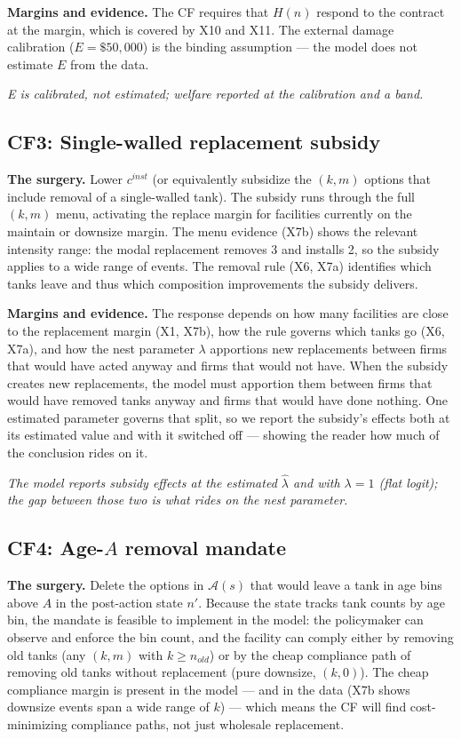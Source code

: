 \documentclass[
  letterpaper,
  DIV=11,
  numbers=noendperiod]{scrartcl}
\begin{document}
\textbf{Margins and evidence.} The CF requires that \(H(n)\) respond to
the contract at the margin, which is covered by X10 and X11. The
external damage calibration (\(E = \$50{,}000\)) is the binding
assumption --- the model does not estimate \(E\) from the data.

\emph{E is calibrated, not estimated; welfare reported at the
calibration and a band.}

\subsection{CF3: Single-walled replacement
subsidy}\label{cf3-single-walled-replacement-subsidy}

\textbf{The surgery.} Lower \(c^{inst}\) (or equivalently subsidize the
\((k,m)\) options that include removal of a single-walled tank). The
subsidy runs through the full \((k,m)\) menu, activating the replace
margin for facilities currently on the maintain or downsize margin. The
menu evidence (X7b) shows the relevant intensity range: the modal
replacement removes 3 and installs 2, so the subsidy applies to a wide
range of events. The removal rule (X6, X7a) identifies which tanks leave
and thus which composition improvements the subsidy delivers.

\textbf{Margins and evidence.} The response depends on how many
facilities are close to the replacement margin (X1, X7b), how the rule
governs which tanks go (X6, X7a), and how the nest parameter \(\lambda\)
apportions new replacements between firms that would have acted anyway
and firms that would not have. When the subsidy creates new
replacements, the model must apportion them between firms that would
have removed tanks anyway and firms that would have done nothing. One
estimated parameter governs that split, so we report the subsidy's
effects both at its estimated value and with it switched off --- showing
the reader how much of the conclusion rides on it.

\emph{The model reports subsidy effects at the estimated \(\hat\lambda\)
and with \(\lambda = 1\) (flat logit); the gap between those two is what
rides on the nest parameter.}

\subsection{\texorpdfstring{CF4: Age-\(A\) removal
mandate}{CF4: Age-A removal mandate}}\label{cf4-age-a-removal-mandate}

\textbf{The surgery.} Delete the options in \(\mathcal{A}(s)\) that
would leave a tank in age bins above \(A\) in the post-action state
\(n'\). Because the state tracks tank counts by age bin, the mandate is
feasible to implement in the model: the policymaker can observe and
enforce the bin count, and the facility can comply either by removing
old tanks (any \((k,m)\) with \(k \ge n_{old}\)) or by the cheap
compliance path of removing old tanks without replacement (pure
downsize, \((k,0)\)). The cheap compliance margin is present in the
model --- and in the data (X7b shows downsize events span a wide range
of \(k\)) --- which means the CF will find cost-minimizing compliance
paths, not just wholesale replacement.
\end{document}
